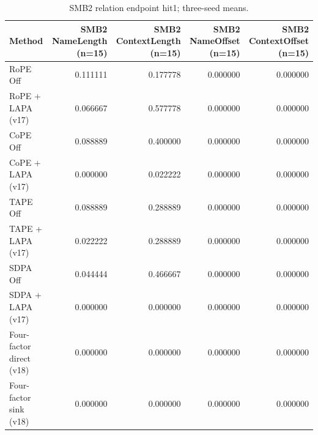 \begin{table}[t]
\centering
\scriptsize
\caption{SMB2 relation endpoint hit1; three-seed means.}
\begin{tabular}{lrrrr}
\toprule
Method & SMB2 NameLength (n=15) & SMB2 ContextLength (n=15) & SMB2 NameOffset (n=15) & SMB2 ContextOffset (n=15) \\
\midrule
RoPE Off & 0.111111 & 0.177778 & 0.000000 & 0.000000 \\
RoPE + LAPA (v17) & 0.066667 & 0.577778 & 0.000000 & 0.000000 \\
CoPE Off & 0.088889 & 0.400000 & 0.000000 & 0.000000 \\
CoPE + LAPA (v17) & 0.000000 & 0.022222 & 0.000000 & 0.000000 \\
TAPE Off & 0.088889 & 0.288889 & 0.000000 & 0.000000 \\
TAPE + LAPA (v17) & 0.022222 & 0.288889 & 0.000000 & 0.000000 \\
SDPA Off & 0.044444 & 0.466667 & 0.000000 & 0.000000 \\
SDPA + LAPA (v17) & 0.000000 & 0.000000 & 0.000000 & 0.000000 \\
Four-factor direct (v18) & 0.000000 & 0.000000 & 0.000000 & 0.000000 \\
Four-factor sink (v18) & 0.000000 & 0.000000 & 0.000000 & 0.000000 \\
\bottomrule
\end{tabular}
\end{table}
